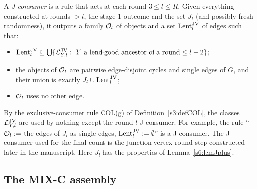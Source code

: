 \begin{definition}\label{s6:defJconsumer}
A \emph{J-consumer} is a rule that acts at each round $3\le l\le R$. Given everything constructed at rounds $>l$, the stage-1 outcome and the set $J_l$ (and possibly fresh randomness), it outputs a family $\mathcal{O}_l$ of objects and a set $\mathrm{Lent}^{\mathrm{JV}}_l$ of edges such that:
\begin{itemize}
\item[\JC{1}] $\mathrm{Lent}^{\mathrm{JV}}_l\subseteq\bigcup\{\mathcal{L}^{\mathrm{JV}}_{Y,l}:\ Y\text{ a lend-good ancestor of a round}\le l-2\}$;
\item[\JC{2}] the objects of $\mathcal{O}_l$ are pairwise edge-disjoint cycles and single edges of $G$, and their union is exactly $J_l\cup\mathrm{Lent}^{\mathrm{JV}}_l$;
\item[\JC{3}] $\mathcal{O}_l$ uses no other edge.
\end{itemize}
By the exclusive-consumer rule COL(g) of Definition~\ref{s3:defCOL}, the classes $\mathcal{L}^{\mathrm{JV}}_{Y,l}$ are used by nothing except the round-$l$ J-consumer. For example, the rule ``$\mathcal{O}_l:=$ the edges of $J_l$ as single edges, $\mathrm{Lent}^{\mathrm{JV}}_l:=\emptyset$'' is a J-consumer. The J-consumer used for the final count is the junction-vertex round step constructed later in the manuscript. Here $J_l$ has the properties of Lemma~\ref{s6:lemJplus}.
\deps{\ref{s3:defCOL}, \ref{s6:lemJplus}}
\end{definition}

\subsection{The MIX-C assembly}

